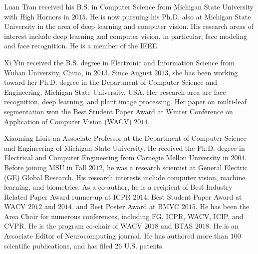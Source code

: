 \documentclass[10pt,journal,compsoc]{IEEEtran}
\begin{document}
% 
\vspace{-7mm}
\begin{IEEEbiography}{Luan Tran}
received his B.S. in Computer Science from Michigan State University
with High Hornors in $2015$. He is now pursuing his Ph.D. also at Michigan State University in the area of deep learning and computer vision. His research areas of interest include deep learning and computer vision, in particular, face modeling and face recognition. He is a member of the IEEE.
\end{IEEEbiography}
\vspace{-7mm}
\begin{IEEEbiography}{Xi Yin} received the B.S. degree in Electronic and Information Science from Wuhan University, China, in $2013$. Since August $2013$, she has been working toward her Ph.D. degree in the Department of Computer Science and Engineering, Michigan State University, USA. Her research area are face recognition, deep learning, and plant image processing. Her paper on multi-leaf segmentation won the Best Student Paper Award at Winter Conference on Application of Computer Vision (WACV) $2014$. 
\end{IEEEbiography}
\vspace{-7mm}
\begin{IEEEbiography}{Xiaoming Liu}is an Associate Professor at the Department of Computer Science and Engineering of Michigan State University. He received the Ph.D. degree in Electrical and Computer Engineering from Carnegie Mellon University in $2004$. Before joining MSU in Fall $2012$, he was a research scientist at General Electric (GE) Global Research. His research interests include computer vision, machine learning, and biometrics. As a co-author, he is a recipient of Best Industry Related Paper Award runner-up at ICPR $2014$, Best Student Paper Award at WACV $2012$ and $2014$, and Best Poster Award at BMVC $2015$. He has been the Area Chair for numerous conferences, including FG, ICPR, WACV, ICIP, and CVPR. He is the program co-chair of WACV $2018$ and BTAS $2018$. He is an Associate Editor of Neurocomputing journal. He has authored more than $100$ scientific publications, and has filed $26$ U.S. patents. 
\end{IEEEbiography}






\end{document}
